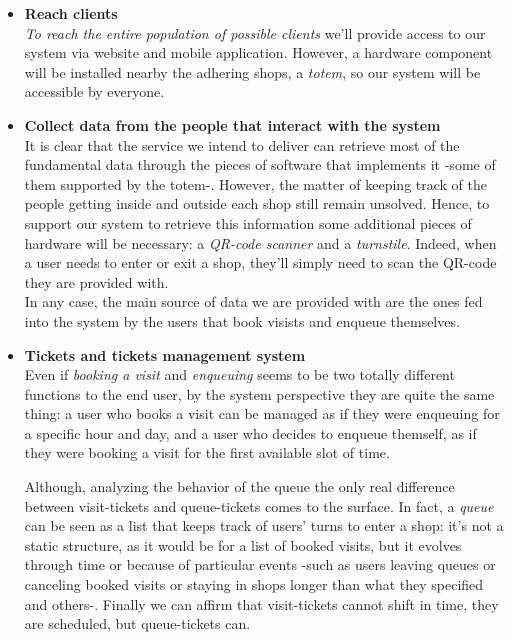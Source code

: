 \begin{itemize}[topsep=0pt]
    \item \textbf{Reach clients}\\
    \textit{To reach the entire population of possible clients} we'll provide access to our system via website and mobile application. However, a hardware component will be installed nearby the adhering shops, a \textit{totem}, so our system will be accessible by everyone.\\

    \item \textbf{Collect data from the people that interact with the system}\\
    It is clear that the service we intend to deliver can retrieve most of the fundamental data through the pieces of software that implements it -some of them supported by the totem-. However, the matter of keeping track of the people getting inside and outside each shop still remain unsolved. Hence, to support our system to retrieve this information some additional pieces of hardware will be necessary: a \textit{QR-code scanner} and a \textit{turnstile}. Indeed, when a user needs to enter or exit a shop, they'll simply need to scan the QR-code they are provided with.\\
    In any case, the main source of data we are provided with are the ones fed into the system by the users that book visists and enqueue themselves.
    
    \item \textbf{Tickets and tickets management system}\\

    Even if \textit{booking a visit} and \textit{enqueuing} seems to be two totally different functions to the end user, by the system perspective they are quite the same thing: a user who books a visit can be managed as if they were enqueuing for a specific hour and day, and a user who decides to enqueue themself, as if they were booking a visit for the first available slot of time. 

    Although, analyzing the behavior of the queue the only real difference between visit-tickets and queue-tickets comes to the surface. In fact, a \textit{queue} can be seen as a list that keeps track of users' turns to enter a shop: it's not a static structure, as it would be for a list of booked visits, but it evolves through time or because of particular events -such as users leaving queues or canceling booked visits or staying in shops longer than what they specified and others-. 
    Finally we can affirm that visit-tickets cannot shift in time, they are scheduled, but queue-tickets can.
    

\end{itemize}
